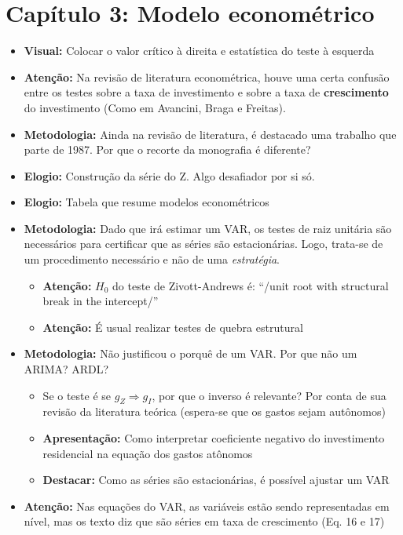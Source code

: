 \documentclass[11pt]{article}
\begin{document}
\section{Capítulo 3: Modelo econométrico}
\label{sec:org877cef2}
\begin{itemize}
\item \textbf{Visual:} Colocar o valor crítico à direita e estatística do teste à esquerda
\item \textbf{Atenção:} Na revisão de literatura econométrica, houve uma certa confusão entre os testes sobre a taxa de investimento e sobre a taxa de \textbf{crescimento} do investimento (Como em Avancini, Braga e Freitas).
\item \textbf{Metodologia:} Ainda na revisão de literatura, é destacado uma trabalho que parte de 1987. Por que o recorte da monografia é diferente?
\item \textbf{Elogio:} Construção da série do Z. Algo desafiador por si só.
\item \textbf{Elogio:} Tabela que resume modelos econométricos
\item \textbf{Metodologia:} Dado que irá estimar um VAR, os testes de raiz unitária são necessários para certificar que as séries são estacionárias. Logo, trata-se de um procedimento necessário e não de uma \emph{estratégia}.
\begin{itemize}
\item \textbf{Atenção:} \(H_0\) do teste de Zivott-Andrews é: ``/unit root with structural break in the intercept/''
\item \textbf{Atenção:} É usual realizar testes de quebra estrutural
\end{itemize}
\item \textbf{Metodologia:} Não justificou o porquê de um VAR. Por que não um ARIMA? ARDL?
\begin{itemize}
\item Se o teste é se \(g_Z \Rightarrow g_I\), por que o inverso é relevante? Por conta de sua revisão da literatura teórica (espera-se que os gastos sejam autônomos)
\item \textbf{Apresentação:} Como interpretar coeficiente negativo do investimento residencial na equação dos gastos atônomos
\item \textbf{Destacar:} Como as séries são estacionárias, é possível ajustar um VAR
\end{itemize}
\item \textbf{Atenção:} Nas equações do VAR, as variáveis estão sendo representadas em nível, mas os texto diz que são séries em taxa de crescimento (Eq. 16 e 17)

\end{itemize}
\end{document}
